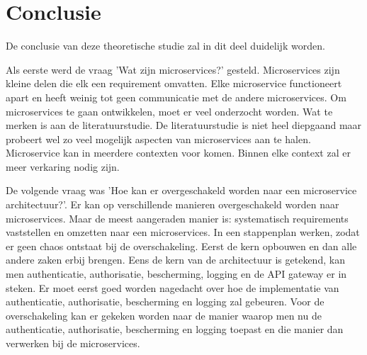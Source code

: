 
\chapter{Conclusie}
\label{ch:conclusie}


De conclusie van deze theoretische studie zal in dit deel duidelijk worden.

Als eerste werd de vraag 'Wat zijn microservices?' gesteld. 
Microservices zijn kleine delen die elk een requirement omvatten. Elke microservice functioneert apart en heeft weinig tot geen communicatie met de andere microservices. Om microservices te gaan ontwikkelen, moet er veel onderzocht worden. Wat te merken is aan de literatuurstudie. De literatuurstudie is niet heel diepgaand maar probeert wel zo veel mogelijk aspecten van microservices aan te halen. Microservice kan in meerdere contexten voor komen. Binnen elke context zal er meer verkaring nodig zijn. 

De volgende vraag was 'Hoe kan er overgeschakeld worden naar een microservice architectuur?'.
Er kan op verschillende manieren overgeschakeld worden naar microservices. Maar de meest aangeraden manier is: systematisch requirements vaststellen en omzetten naar een microservices. In een stappenplan werken, zodat er geen chaos ontstaat bij de overschakeling. Eerst de kern opbouwen en dan alle andere zaken erbij brengen. Eens de kern van de architectuur is getekend, kan men authenticatie, authorisatie, bescherming, logging en de API gateway er in steken. Er moet eerst goed worden nagedacht over hoe de implementatie van authenticatie, authorisatie, bescherming en logging zal gebeuren. Voor de overschakeling kan er gekeken worden naar de manier waarop men nu de authenticatie, authorisatie, bescherming en logging toepast en die manier dan verwerken bij de microservices.  

